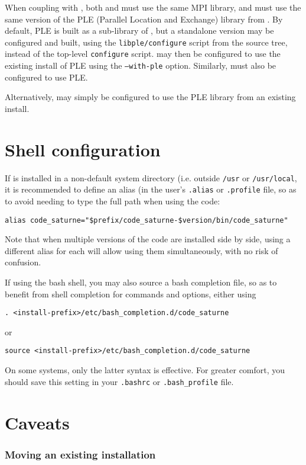 \documentclass[a4paper,10pt,twoside]{csshortdoc}
\begin{document}
When coupling with , both \CS and \syrthes must
use the same MPI library, and must use the same version of the
PLE (Parallel Location and Exchange) library from \CS. By default, PLE
is built as a sub-library of \CS, but a standalone version may be
configured and built, using the \texttt{libple/configure} script
from the \CS source tree, instead of the top-level \texttt{configure}
script. \CS may then be configured to use the existing install of PLE
using the \texttt{--with-ple} option. Similarly, \syrthes must also
be configured to use PLE.

Alternatively,  may simply be configured to use the PLE
library from an existing \CS install.

\section{Shell configuration}

If \CS is installed in a non-default system directory (i.e. outside
\texttt{/usr} or \texttt{/usr/local}, it is recommended to define
an alias (in the user's \texttt{.alias} or \texttt{.profile} file, so as to
avoid needing to type the full path when using the code:

\texttt{alias code\_saturne="\$prefix/code\_saturne-\$version/bin/code\_saturne"}

Note that when multiple versions of the code are installed side by side, using
a different alias for each will allow using them simultaneously, with no risk
of confusion.

If using the bash shell, you may also source a bash completion file,
so as to benefit from shell completion for \CS commands
and options, either using

\texttt{. <install-prefix>/etc/bash\_completion.d/code\_saturne}

or

\texttt{source <install-prefix>/etc/bash\_completion.d/code\_saturne}

On some systems, only the latter syntax is effective. For greater
comfort, you should save this setting in your \texttt{.bashrc}
or \texttt{.bash\_profile} file.

\section{Caveats}

\subsubsection{Moving an existing installation}
\end{document}
